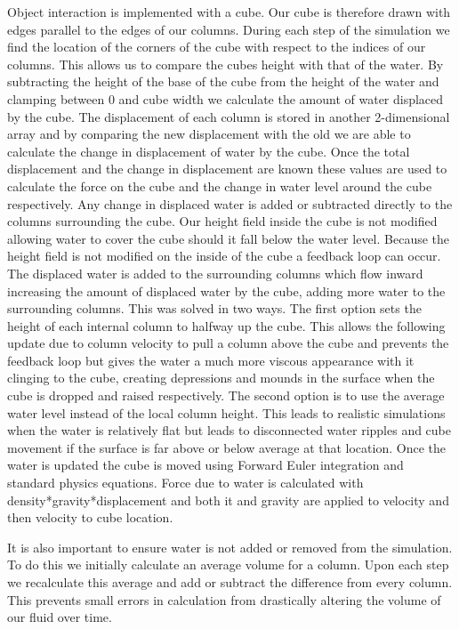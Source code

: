\documentclass[12pt,titlepage]{article}
\begin{document}
Object interaction is implemented with a cube.  Our cube is therefore drawn with edges parallel to the edges of our columns.  During each step of the simulation we find the location of the corners of the cube with respect to the indices of our columns.  This allows us to compare the cubes height with that of the water.  By subtracting the height of the base of the cube from the height of the water and clamping between 0 and cube width we calculate the amount of water displaced by the cube.  The displacement of each column is stored in another 2-dimensional array and by comparing the new displacement with the old we are able to calculate the change in displacement of water by the cube.  Once the total displacement and the change in displacement are known these values are used to calculate the force on the cube and the change in water level around the cube respectively.  Any change in displaced water is added or subtracted directly to the columns surrounding the cube.  Our height field inside the cube is not modified allowing water to cover the cube should it fall below the water level.  Because the height field is not modified on the inside of the cube a feedback loop can occur.  The displaced water is added to the surrounding columns which flow inward increasing the amount of displaced water by the cube, adding more water to the surrounding columns.  This was solved in two ways.  The first option sets the height of each internal column to halfway up the cube.  This allows the following update due to column velocity to pull a column above the cube and prevents the feedback loop but gives the water a much more viscous appearance with it clinging to the cube, creating depressions and mounds in the surface when the cube is dropped and raised respectively.  The second option is to use the average water level instead of the local column height.  This leads to realistic simulations when the water is relatively flat but leads to disconnected water ripples and cube movement if the surface is far above or below average at that location.  Once the water is updated the cube is moved using Forward Euler integration and standard physics equations.  Force due to water is calculated with density*gravity*displacement and both it and gravity are applied to velocity and then velocity to cube location.

It is also important to ensure water is not added or removed from the simulation.  To do this we initially calculate an average volume for a column.  Upon each step we recalculate this average and add or subtract the difference from every column.  This prevents small errors in calculation from drastically altering the volume of our fluid over time.
\end{document}
